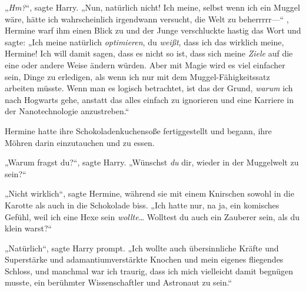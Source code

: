 „\emph{Hm?}“, sagte Harry. „Nun, natürlich nicht! Ich meine, selbst wenn ich ein Muggel wäre, hätte ich wahrscheinlich irgendwann versucht, die Welt zu beherrrrr—“ , Hermine warf ihm einen Blick zu und der Junge verschluckte hastig das Wort und sagte: „Ich meine natürlich \emph{optimieren}, du \emph{weißt}, dass ich das wirklich meine, Hermine! Ich will damit sagen, dass es nicht so ist, dass sich meine \emph{Ziele} auf die eine oder andere Weise ändern würden. Aber mit Magie wird es viel einfacher sein, Dinge zu erledigen, als wenn ich nur mit dem Muggel-Fähigkeitssatz arbeiten müsste. Wenn man es logisch betrachtet, ist das der Grund, \emph{warum} ich nach Hogwarts gehe, anstatt das alles einfach zu ignorieren und eine Karriere in der Nanotechnologie anzustreben.“

Hermine hatte ihre Schokoladenkuchensoße fertiggestellt und begann, ihre Möhren darin einzutauchen und zu essen.

„Warum fragst du?“, sagte Harry. „Wünschst \emph{du} dir, wieder in der Muggelwelt zu sein?“

„Nicht wirklich“, sagte Hermine, während sie mit einem Knirschen sowohl in die Karotte als auch in die Schokolade biss. „Ich hatte nur, na ja, ein komisches Gefühl, weil ich eine Hexe sein \emph{wollte}… Wolltest du auch ein Zauberer sein, als du klein warst?“

„Natürlich“, sagte Harry prompt. „Ich wollte auch übersinnliche Kräfte und Superstärke und adamantiumverstärkte Knochen und mein eigenes fliegendes Schloss, und manchmal war ich traurig, dass ich mich vielleicht damit begnügen musste, ein berühmter Wissenschaftler und Astronaut zu sein.“


